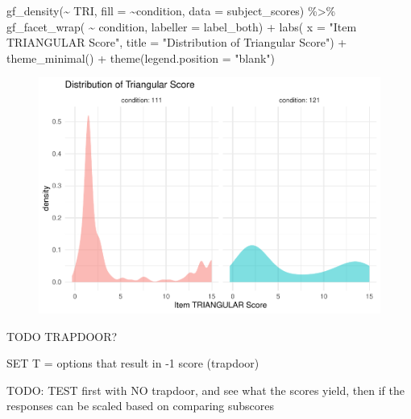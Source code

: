\documentclass[
  letterpaper,
  DIV=11,
  numbers=noendperiod]{scrreprt}
\newenvironment{Shaded}{\begin{snugshade}}{\end{snugshade}}
\newcommand{\AttributeTok}[1]{\textcolor[rgb]{0.40,0.45,0.13}{#1}}
\newcommand{\FunctionTok}[1]{\textcolor[rgb]{0.28,0.35,0.67}{#1}}
\newcommand{\NormalTok}[1]{\textcolor[rgb]{0.00,0.23,0.31}{#1}}
\newcommand{\SpecialCharTok}[1]{\textcolor[rgb]{0.37,0.37,0.37}{#1}}
\newcommand{\StringTok}[1]{\textcolor[rgb]{0.13,0.47,0.30}{#1}}
\begin{document}
\begin{Shaded}
\begin{Highlighting}[]
\FunctionTok{gf\_density}\NormalTok{(}\SpecialCharTok{\textasciitilde{}}\NormalTok{ TRI, }\AttributeTok{fill =} \SpecialCharTok{\textasciitilde{}}\NormalTok{condition, }\AttributeTok{data =}\NormalTok{ subject\_scores) }\SpecialCharTok{\%\textgreater{}\%} 
  \FunctionTok{gf\_facet\_wrap}\NormalTok{( }\SpecialCharTok{\textasciitilde{}}\NormalTok{ condition, }\AttributeTok{labeller =}\NormalTok{ label\_both) }\SpecialCharTok{+} 
  \FunctionTok{labs}\NormalTok{( }\AttributeTok{x =} \StringTok{"Item TRIANGULAR Score"}\NormalTok{, }\AttributeTok{title =} \StringTok{"Distribution of Triangular Score"}\NormalTok{) }\SpecialCharTok{+} \FunctionTok{theme\_minimal}\NormalTok{() }\SpecialCharTok{+} \FunctionTok{theme}\NormalTok{(}\AttributeTok{legend.position =} \StringTok{"blank"}\NormalTok{)}
\end{Highlighting}
\end{Shaded}

\begin{figure}[H]

{\centering \includegraphics{analysis/SGC3A/2_sgc3A_scoring_files/figure-pdf/unnamed-chunk-89-2.pdf}

}

\end{figure}

TODO TRAPDOOR?

SET T = options that result in -1 score (trapdoor)

TODO: TEST first with NO trapdoor, and see what the scores yield, then
if the responses can be scaled based on comparing subscores
\end{document}
